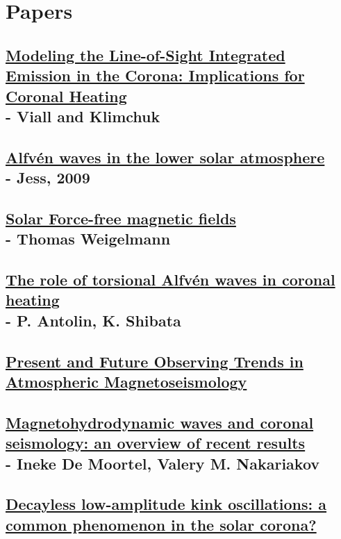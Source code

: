 \documentclass{article}
\begin{document}
\section{Papers}
\subsection{%
    \href{http://arxiv.org/abs/1304.5439}
    {Modeling the Line-of-Sight Integrated Emission in the Corona:
    Implications for Coronal Heating}\\
    - Viall and Klimchuk}
\subsection{%
    \href{http://arxiv.org/abs/0903.3546}
    {Alfv\'en waves in the lower solar atmosphere}\\
    - Jess, 2009}

\subsection{%
    \href{https://arxiv.org/abs/1208.4693}
    {Solar Force-free magnetic fields}\\
    - Thomas Weigelmann
}
\subsection{%
    \href{https://arxiv.org/abs/0910.0962}
    {The role of torsional Alfv\'en waves in coronal heating}\\
    - P. Antolin, K. Shibata}

\subsection{%
\href{http://link.springer.com/article/10.1007\%2Fs11207-007-9029-z}
{Present and Future Observing Trends in Atmospheric Magnetoseismology}\\
}

\subsection{%
\href{http://rsta.royalsocietypublishing.org/content/370/1970/3193}
{Magnetohydrodynamic waves and coronal seismology: an overview of recent results}\\
- Ineke De Moortel, Valery M. Nakariakov}

\subsection{%
\href{http://arxiv.org/abs/1509.05519}
{Decayless low-amplitude kink oscillations: a common phenomenon in the solar corona?}}
\end{document}
